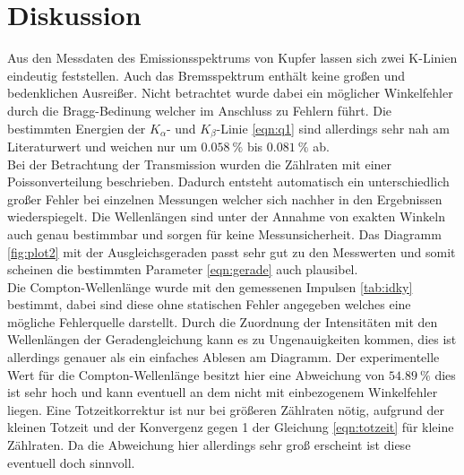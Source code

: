\section{Diskussion}

Aus den Messdaten des Emissionsspektrums von Kupfer lassen sich zwei K-Linien eindeutig feststellen. Auch das Bremsspektrum enthält keine großen und bedenklichen Ausreißer.
Nicht betrachtet wurde dabei ein möglicher Winkelfehler durch die Bragg-Bedinung welcher im Anschluss zu Fehlern führt. Die bestimmten Energien
der $K_{\alpha}$- und $K_{\beta}$-Linie \eqref{eqn:q1} sind allerdings sehr nah am Literaturwert und weichen nur um $\SI{0.058}{\percent}$ bis $\SI{0.081}{\percent}$ ab.
\\
\newline
Bei der Betrachtung der Transmission wurden die Zählraten mit einer Poissonverteilung beschrieben. Dadurch entsteht automatisch ein unterschiedlich großer Fehler
bei einzelnen Messungen welcher sich nachher in den Ergebnissen wiederspiegelt. Die Wellenlängen sind unter der Annahme von exakten Winkeln auch genau bestimmbar und sorgen für
keine Messunsicherheit. Das Diagramm \ref{fig:plot2} mit der Ausgleichsgeraden passt sehr gut zu den Messwerten und somit scheinen die bestimmten Parameter \eqref{eqn:gerade} auch plausibel.
\\
\newline
Die Compton-Wellenlänge wurde mit den gemessenen Impulsen \ref{tab:idky} bestimmt, dabei sind diese ohne statischen Fehler angegeben welches eine mögliche Fehlerquelle darstellt.
Durch die Zuordnung der Intensitäten mit den Wellenlängen der Geradengleichung kann es zu Ungenauigkeiten kommen, dies ist allerdings genauer als ein einfaches Ablesen am Diagramm.
Der experimentelle Wert für die Compton-Wellenlänge besitzt hier eine Abweichung von $\SI{54.89}{\percent}$ dies ist sehr hoch und kann eventuell an dem nicht mit einbezogenem Winkelfehler liegen.
Eine Totzeitkorrektur ist nur bei größeren Zählraten nötig, aufgrund der kleinen Totzeit und der Konvergenz gegen 1 der Gleichung \eqref{eqn:totzeit} für kleine Zählraten. Da die Abweichung hier allerdings sehr groß erscheint
ist diese eventuell doch sinnvoll.

